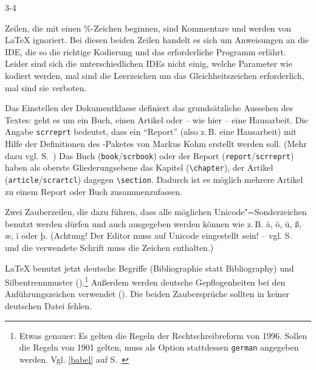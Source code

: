 \begin{labeling}{3-4}

 \item[1-2] Zeilen, die mit einen \%-Zeichen beginnen, sind Kommentare und
   werden von \LaTeX{} ignoriert. Bei diesen beiden Zeilen handelt es sich
   um Anweisungen an die IDE, die so die richtige Kodierung und das
   erforderliche Programm erfährt.  Leider sind sich die unterschiedlichen
   IDEs nicht einig, welche Parameter wie kodiert werden, mal sind die
   Leerzeichen um das Gleichheitszeichen erforderlich, mal sind sie
   verboten.

 \item[3] Das Einstellen der Dokumentklasse definiert das grundsätzliche
   Aussehen des Textes: geht es um ein Buch, einen Artikel oder -- wie hier
   -- eine Hausarbeit.  Die Angabe \lstinline/scrreprt/ bedeutet, dass ein
   \enquote{Report} (also z.\,B. eine Hausarbeit) mit Hilfe der Definitionen
   des \KOMAScript-Paketes von Markus Kohm erstellt werden soll.  (Mehr dazu
   vgl. S.~\pageref{komaskript}) Das Buch (\lstinline/book//\lstinline/scrbook/)
   oder der Report  (\lstinline/report//\lstinline/scrreprt/) haben
   als oberste Gliederungsebene das Kapitel (\lstinline/\chapter/), der Artikel
   (\lstinline/article//\lstinline/scrartcl/) dagegen \lstinline/\section/.
   Dadurch ist es möglich mehrere Artikel zu einem Report oder Buch zusammenzufassen.
 
 \item[5-6] Zwei Zauberzeilen, die dazu führen, dass alle möglichen
   Unicode"=Sonderzeichen benutzt werden dürfen und auch ausgegeben werden
   können wie z.\,B. ä, ö, ü, ß, æ, ï oder þ.  (Achtung! Der Editor muss auf
   Unicode eingestellt sein! -- vgl. S.~\pageref{unicode} und die verwendete
   Schrift muss die Zeichen enthalten.)
 
 \item[8-9] \LaTeX{} benutzt jetzt deutsche Begriffe (Bibliographie statt
   Bibliography) und Silbentrennmuster ().\footnote{Etwas
   genauer: Es gelten die Regeln der Rechtschreibreform von 1996.
   Sollen die Regeln von 1901 gelten, muss als Option stattdessen
   \lstinline/german/ angegeben werden. Vgl. \ref{babel} auf
   S.~\pageref{babel}} Außerdem werden deutsche Gepflogenheiten bei
   den Anführungszeichen verwendet ().  Die beiden
   Zaubersprüche sollten in keiner deutschen Datei fehlen.
 

\end{labeling}
